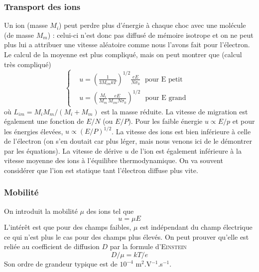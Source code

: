 		\subsubsection{Transport des ions}	
		Un ion (masse $M_i$) peut perdre plus d'énergie à chaque choc avec une molécule (de masse
		$M_m$) : celui-ci n'est donc pas diffusé de mémoire isotrope et on ne peut plus lui a
		attribuer une vitesse aléatoire comme nous l'avons fait pour l'électron. Le calcul de 
		la moyenne est plus compliqué, mais on peut montrer que (calcul très compliqué)
		\begin{equation}
		\left\{
\begin{aligned}
   &u=\left(\frac{1}{3M_{im}kT}\right)^{1/2}\frac{eE}{N\sigma_0} \mbox{~~pour E petit}&\\
   &u=\left(\frac{M_i}{M_m}\frac{eE}{M_{im}N\sigma_0}\right)^{1/2}  \mbox{~~pour E grand}& 
\end{aligned} 
\right.
		\end{equation}
		où $L_{im} = M_iM_m/(M_i+M_m)$ est la masse réduite. La vitesse de migration est également 
		une fonction de $E/N$ (ou $E/P$). Pour les faible énergie $u\propto E/p$ et pour les 
		énergies élevées, $u\propto (E/P)^{1/2}$. La vitesse des ions est bien inférieure à celle
		de l'électron (on s'en doutait car plus léger, mais nous venons ici de le démontrer par
		les équations). La vitesse de dérive $u$ de l'ion est également inférieure à la vitesse
		moyenne des ions à l'équilibre thermodynamique. On va souvent considérer que l'ion est 
		statique tant l'électron diffuse plus vite.
		
		
		\subsubsection{Mobilité}
		On introduit la mobilité $\mu$ des ions tel que
		\begin{equation}
		u=\mu E
		\end{equation}
		L'intérêt est que pour des champs faibles, $\mu$ est indépendant du champ électrique ce 
		qui n'est plus le cas pour des champs plus élevés. On peut prouver qu'elle est reliée 
		au coefficient de diffusion $D$ par la formule d'\textsc{Einstein}
		\begin{equation}
		D/\mu=kT/e
		\end{equation}
		Son ordre de grandeur typique est de $10^{-4}$ m$^{2}$.V$^{-1}$.s$^{-1}$.
	
	
	
	
	
	
	
